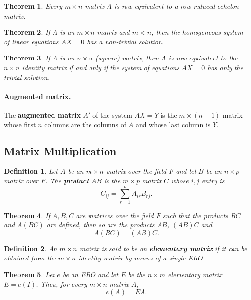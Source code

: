 \documentclass{article}
\newtheorem{theorem}{Theorem}
\newtheorem*{definition*}{Definition}
\begin{document}
\begin{theorem}
  Every $m \times n$ matrix $A$ is row-equivalent to a row-reduced echelon
  matrix.
\end{theorem}

\begin{theorem}
  If $A$ is an $m \times n$ matrix and $m < n$, then the homogeneous system of
  linear equations $AX = 0$ has a non-trivial solution.
\end{theorem}

\begin{theorem}
  If $A$ is an $n \times n$ (square) matrix, then $A$ is row-equivalent to the
  $n \times n$ identity matrix if and only if the system of equations $AX = 0$
  has only the trivial solution.
\end{theorem}

\paragraph{Augmented matrix.} The \textbf{augmented matrix} $A'$ of the system
$AX = Y$ is the $m \times (n + 1)$ matrix whose first $n$ columns are the
columns of $A$ and whose last column is $Y$.

\subsection{Matrix Multiplication}

\begin{definition*}
  Let $A$ be an $m \times n$ matrix over the field $F$ and let $B$ be an $n
  \times p$ matrix over $F$. The \textbf{product} $AB$ is the $m \times p$
  matrix $C$ whose $i, j$ entry is \[
    C_{ij} = \sum_{r=1}^n A_{ir}B_{rj}.
  \]
\end{definition*}

\begin{theorem}
  If $A, B, C$ are matrices over the field $F$ such that the products $BC$ and
  $A(BC)$ are defined, then so are the products $AB$, $(AB)C$ and \[
    A(BC) = (AB)C.
  \]
\end{theorem}

\begin{definition*}
  An $m \times n$ matrix is said to be an \textbf{elementary matrix} if it can
  be obtained from the $m \times n$ identity matrix by means of a single ERO.
\end{definition*}

\begin{theorem}
  Let $e$ be an ERO and let $E$ be the $n \times m$ elementary matrix $E =
  e(I)$. Then, for every $m \times n$ matrix $A$, \[
    e(A) = EA.
  \]
\end{theorem}
\end{document}
